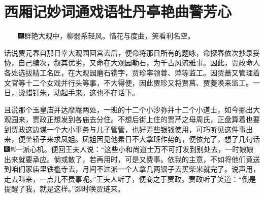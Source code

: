 

\chapter{西厢记妙词通戏语\hspace{.5em}牡丹亭艳曲警芳心}
{　　\includegraphics[width=3mm]{../Images/00005}群艳大观中，柳弱系轻风。惜花与度曲，笑看利名空。}

话说贾元春自那日幸大观园回宫去后，便命将那日所有的题咏，命探春依次抄录妥协，自己编次，叙其优劣，又命在大观园勒石，为千古风流雅事。因此，贾政命人各处选拔精工名匠，在大观园磨石镌字，贾珍率领蓉、萍等监工。因贾蔷又管理着文官等十二个女戏并行头等事，不大得便，因此贾珍又将贾菖、贾菱唤来监工。一日，烫蜡钉朱，动起手来。这也不在话下。

且说那个玉皇庙并达摩庵两处，一班的十二个小沙弥并十二个小道士，如今挪出大观园来，贾政正想发到各庙去分住。不想后街上住的贾芹之母周氏，正盘算着也要到贾政这边谋一个大小事务与儿子管管，也好弄些银钱使用，可巧听见这件事出来，便坐轿子来求凤姐。凤姐因见他素日不大拿班作势的，便依允了，想了几句话{\includegraphics[width=3mm]{../Images/00004}\includegraphics[width=3mm]{../Images/00011}\footnotesize \kaishu 一派心机。}便回王夫人说：``这些小和尚道士万不可打发到别处去，一时娘娘出来就要承应。倘或散了，若再用时，可是又费事。依我的主意，不如将他们竟送到咱们家庙里铁槛寺去，月间不过派一个人拿几两银子去买柴米就完了。说声用，走去叫来，一点儿不费事呢。''王夫人听了，便商之于贾政。贾政听了笑道：``倒是提醒了我，就是这样。''即时唤贾琏来。

